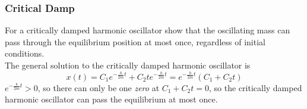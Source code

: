 \documentclass{beamer}
\begin{document}
\begin{frame}
\frametitle{Critical Damp}
For a critically damped harmonic oscillator show that the oscillating mass can pass through the equilibrium position at most once, regardless of initial conditions.\\
The general solution to the critically damped harmonic oscillator is
\[x(t)=C_1e^{-\frac{b}{2m}t}+C_2te^{-\frac{b}{2m}t}=e^{-\frac{b}{2m}t}(C_1+C_2t)\]
$e^{-\frac{b}{2m}t}>0$, so there can only be one \emph{zero} at $C_1+C_2t=0$, so the critically damped harmonic oscillator can pass the equilibrium at most once.
\end{frame}
\end{document}
